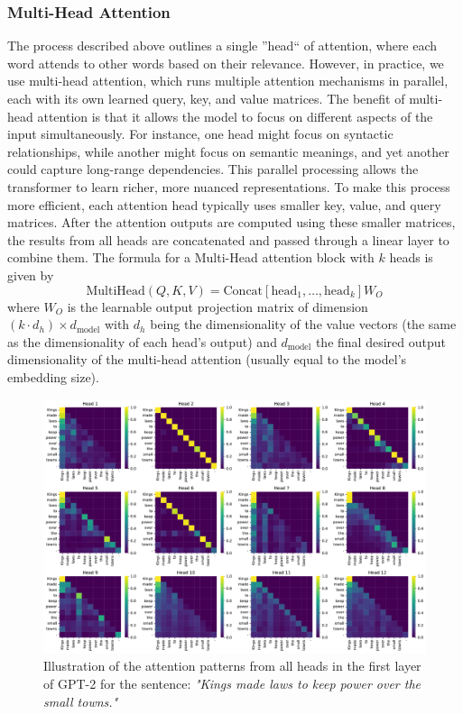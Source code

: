 \subsubsection{Multi-Head Attention}
The process described above outlines a single ''head`` of attention, where each word attends to other words 
based on their relevance. However, in practice, we use multi-head attention, which runs multiple attention 
mechanisms in parallel, each with its own learned query, key, and value matrices.\newline
The benefit of multi-head attention is that it allows the model to focus on different aspects of the input 
simultaneously. For instance, one head might focus on syntactic relationships, while another might focus on 
semantic meanings, and yet another could capture long-range dependencies. This parallel processing allows 
the transformer to learn richer, more nuanced representations.\newline
To make this process more efficient, each attention head typically uses smaller key, value, and query 
matrices. After the attention 
outputs are computed using these smaller matrices, the results from all heads are concatenated and passed 
through a linear layer to combine them. The formula for a Multi-Head attention block with $k$ heads is given by 
$$\text{MultiHead}(Q,K,V)=\text{Concat}[\text{head}_1,\dots,\text{head}_k]W_O$$
where $W_O$ is the learnable output projection matrix of dimension $(k\cdot d_h) \times d_\text{model}$
with $d_h$ being the dimensionality of the value vectors (the same as the dimensionality of each head's output) and
$d_\text{model}$  the final desired output dimensionality of the multi-head attention (usually equal to the 
model's embedding size).
\begin{figure}[H]
    \centering
    \includegraphics[width=0.8\linewidth]{images/multi_head_attn.pdf}
  \caption{Illustration of the attention patterns from all heads in the first layer of GPT-2 for the sentence: \textit{"Kings 
  made laws to keep power over the small towns."}}
\end{figure}

